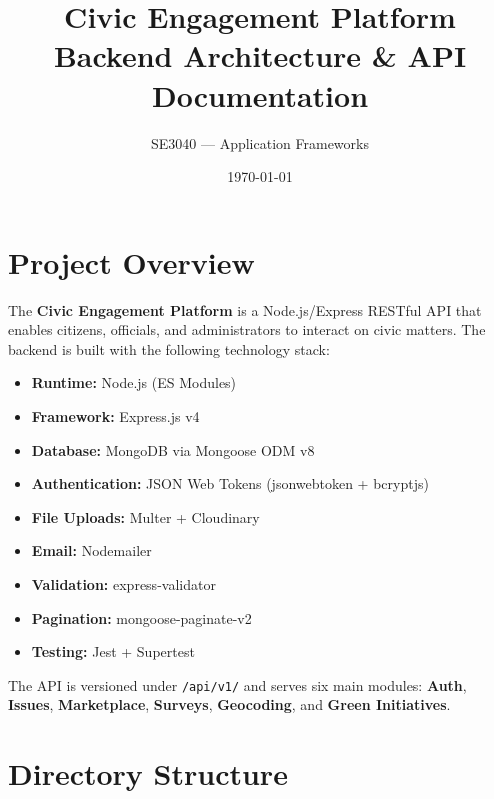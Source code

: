 \documentclass[12pt,a4paper]{article}
\title{%
  \vspace{-1cm}
  \textbf{Civic Engagement Platform}\\[4pt]
  \Large Backend Architecture \& API Documentation
}
\author{SE3040 --- Application Frameworks}
\date{\today}
\begin{document}
\maketitle
\tableofcontents
\newpage

\section{Project Overview}

The \textbf{Civic Engagement Platform} is a Node.js/Express RESTful API that enables citizens, officials, and administrators to interact on civic matters. The backend is built with the following technology stack:

\begin{itemize}[leftmargin=1.5cm]
  \item \textbf{Runtime:} Node.js (ES Modules)
  \item \textbf{Framework:} Express.js v4
  \item \textbf{Database:} MongoDB via Mongoose ODM v8
  \item \textbf{Authentication:} JSON Web Tokens (jsonwebtoken + bcryptjs)
  \item \textbf{File Uploads:} Multer + Cloudinary
  \item \textbf{Email:} Nodemailer
  \item \textbf{Validation:} express-validator
  \item \textbf{Pagination:} mongoose-paginate-v2
  \item \textbf{Testing:} Jest + Supertest
\end{itemize}

The API is versioned under \texttt{/api/v1/} and serves six main modules:
\textbf{Auth}, \textbf{Issues}, \textbf{Marketplace}, \textbf{Surveys}, \textbf{Geocoding}, and \textbf{Green Initiatives}.

\section{Directory Structure}
\end{document}
